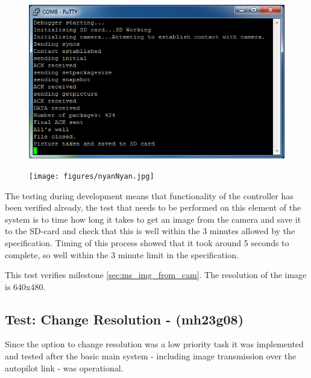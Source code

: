 \begin{figure}[H]
        \centering
        \includegraphics[width=1.00\textwidth]{testing_screenshots/camera_image_saving_sd_card_test.png}
        \label{fig:test_camera_image_saving_sd_card}
\end{figure}

\begin{figure}[H]
        \centering
        \texttt{[image: figures/nyanNyan.jpg]}
        \label{fig:Nyan1}
\end{figure}

The testing during development means that functionality of the controller has been verified already, the test that needs to be performed on this element of the system is to time how long it takes to get an image from the camera and save it to the SD-card and check that this is well within the 3 minutes allowed by the specification. Timing of this process showed that it took around 5 seconds to complete, so well within the 3 minute limit in the specification.

This test verifies milestone \ref{sec:ms_img_from_cam}. The resolution of the image is 640x480.

\subsection{Test: Change Resolution - (mh23g08)}
\label{sec:test_change_resolution}

Since the option to change resolution was a low priority task it was implemented and tested after the basic main system - including image transmission over the autopilot link - was operational.

